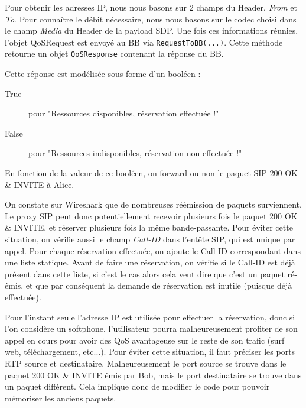 \documentclass[a4paper,11pt]{article}
\begin{document}
Pour obtenir les adresses IP, nous nous basons sur 2 champs du Header, \emph{From}  et \emph{To}. Pour connaître le débit nécessaire, nous nous basons sur le codec choisi dans le champ \emph{Media} du Header de la payload SDP. Une fois ces informations réunies, l’objet QoSRequest est envoyé au BB via \texttt{RequestToBB(...)}. Cette méthode retourne un objet \texttt{QoSResponse} contenant la réponse du BB. 
\begin{samepage}
    Cette réponse est modélisée sous forme d’un booléen :
    \begin{description}
        \item[True] pour "Ressources disponibles, réservation effectuée !"
        \item[False] pour "Ressources indisponibles, réservation non-effectuée !"
    \end{description}
\end{samepage}


En fonction de la valeur de ce booléen, on forward ou non le paquet SIP 200 OK \& INVITE à Alice.

On constate sur Wireshark que de nombreuses réémission de paquets surviennent. Le proxy SIP peut donc potentiellement recevoir plusieurs fois le paquet 200 OK \& INVITE, et réserver plusieurs fois la même bande-passante. Pour éviter cette situation, on vérifie aussi le champ \emph{Call-ID} dans l'entête SIP, qui est unique par appel. Pour chaque réservation effectuée, on ajoute le Call-ID correspondant dans une liste statique. Avant de faire une réservation, on vérifie si le Call-ID est déjà présent dans cette liste, si c’est le cas alors cela veut dire que c’est un paquet ré-émis, et que par conséquent la demande de réservation est inutile (puisque déjà effectuée).    

Pour l’instant seule l’adresse IP est utilisée pour effectuer la réservation, donc si l’on considère un softphone, l’utilisateur pourra malheureusement profiter de son appel en cours pour avoir des QoS avantageuse sur le reste de son trafic (surf web, téléchargement, etc...). Pour éviter cette situation, il faut préciser les ports RTP source et destinataire. Malheureusement le port source se trouve dans le paquet 200 OK \& INVITE émis par Bob, mais le port destinataire se trouve dans un paquet différent. Cela implique donc de modifier le code pour pouvoir mémoriser les anciens paquets.
\end{document}
